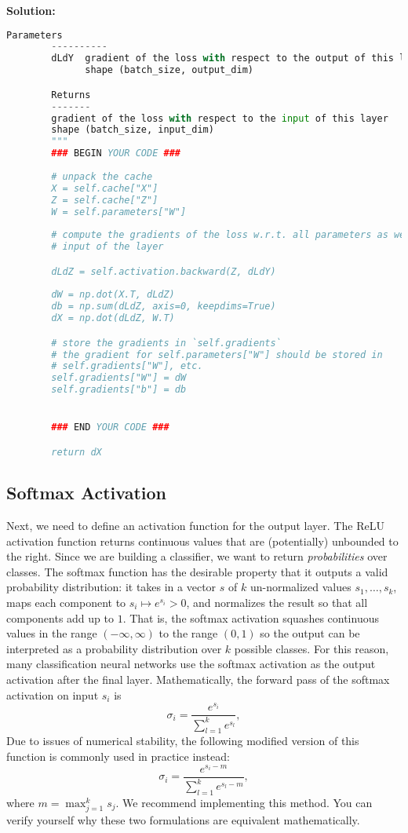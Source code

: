 \documentclass{article}
\newenvironment{solution}{\color{blue} \smallskip \textbf{Solution:}}{}
\begin{document}
\begin{solution}
\begin{lstlisting}[language=Python]
        Parameters
        ----------
        dLdY  gradient of the loss with respect to the output of this layer
              shape (batch_size, output_dim)

        Returns
        -------
        gradient of the loss with respect to the input of this layer
        shape (batch_size, input_dim)
        """
        ### BEGIN YOUR CODE ###
        
        # unpack the cache
        X = self.cache["X"]
        Z = self.cache["Z"]
        W = self.parameters["W"]
        
        # compute the gradients of the loss w.r.t. all parameters as well as the
        # input of the layer

        dLdZ = self.activation.backward(Z, dLdY)
        
        dW = np.dot(X.T, dLdZ)
        db = np.sum(dLdZ, axis=0, keepdims=True)
        dX = np.dot(dLdZ, W.T)

        # store the gradients in `self.gradients`
        # the gradient for self.parameters["W"] should be stored in
        # self.gradients["W"], etc.
        self.gradients["W"] = dW
        self.gradients["b"] = db


        ### END YOUR CODE ###

        return dX

\end{lstlisting}

	
\end{solution}

\newpage
\subsection{Softmax Activation}
Next, we need to define an activation function for the output layer. 
The ReLU activation function returns continuous values that are (potentially) unbounded to the right. 
Since we are building a classifier, we want to return \textit{probabilities} over classes. 
The softmax function has the desirable property that it outputs a valid probability distribution: it takes in a vector $s$ of $k$ un-normalized values $s_1, \ldots, s_k$, maps each component to $s_i \mapsto e^{s_i} > 0$, and normalizes the result so that all components add up to $1$. 
That is, the softmax activation squashes continuous values in the range $(-\infty, \infty)$ to the range $(0, 1)$ so the output can be interpreted as a probability distribution over $k$ possible classes. 
For this reason, many classification neural networks use the softmax activation as the output activation after the final layer. 
Mathematically, the forward pass of the softmax activation on input $s_i$ is 
\[
    \sigma_i = \frac{e^{s_i}}{\sum_{l=1}^{k} e^{s_l}},
\]
Due to issues of numerical stability, the following modified version of this function is commonly used in practice instead:
\[
    \sigma_i = \frac{e^{s_i - m}}{\sum_{l=1}^{k} e^{s_l-m}},
\]
where $m = \max_{j=1}^k s_j$. 
We recommend implementing this method. 
You can verify yourself why these two formulations are equivalent mathematically.
\end{document}
